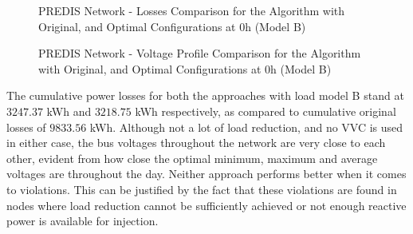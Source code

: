 
\begin{figure}[!h]
\begin{minipage}[!h]{.5\textwidth}
	\centering
    \setlength\figureheight{5cm}
    \setlength\figurewidth{6cm}
	
\end{minipage}
\begin{minipage}[!h]{.5\textwidth}
	\centering
	\setlength\figureheight{5cm}
    \setlength\figurewidth{6cm}
	
\end{minipage}
\caption{PREDIS Network - Losses Comparison for the Algorithm with Original, and Optimal Configurations at $0$h (Model B)}
\end{figure}

\begin{figure}[!h]
\begin{minipage}[!h]{.5\textwidth}
	\centering
    \setlength\figureheight{5cm}
    \setlength\figurewidth{6cm}
	
\end{minipage}
\begin{minipage}[!h]{.5\textwidth}
	\centering
	\setlength\figureheight{5cm}
    \setlength\figurewidth{6cm}
	
\end{minipage}
\caption{PREDIS Network - Voltage Profile Comparison for the Algorithm with Original, and Optimal Configurations at $0$h (Model B)}
\end{figure}

The cumulative power losses for both the approaches with load model B stand at $3247.37$ kWh and $3218.75$ kWh respectively, as compared to cumulative original losses of $9833.56$ kWh. Although not a lot of load reduction, and no VVC is used in either case, the bus voltages throughout the network are very close to each other, evident from how close the optimal minimum, maximum and average voltages are throughout the day. Neither approach performs better when it comes to violations. This can be justified by the fact that these violations are found in nodes where load reduction cannot be sufficiently achieved or not enough reactive power is available for injection.\\

